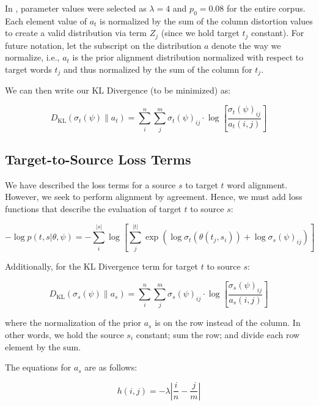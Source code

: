 \documentclass[twoside,twocolumn]{article}
\newlength\mystoreparindent
\newenvironment{myparindent}[1]{%
  \setlength{\mystoreparindent}{\the\parindent}
  \setlength{\parindent}{#1}
  }{%
  \setlength{\parindent}{\mystoreparindent}
}
\begin{document}
\begin{myparindent}{0pt}
In \cite{dyer2013simple}, parameter values were selected as $\lambda = 4$ and
$p_0 = 0.08$ for the entire corpus. Each element value of $a_t$ is normalized
by the sum of the column distortion values to create a valid distribution via
term $Z_j$ (since we hold target $t_j$ constant). For future notation, let the
subscript on the distribution $a$ denote the way we normalize, i.e., $a_t$ is
the prior alignment distribution normalized with respect to target words $t_j$
and thus normalized by the sum of the column for $t_j$.

We can then write our KL Divergence (to be minimized) as:

\begin{equation}
  D_{\mathrm{KL}}(\sigma_t(\psi) \| a_t) =
    \sum_i^n \sum_j^m \sigma_t(\psi)_{ij} \cdot
      \log \left[ \frac{\sigma_t(\psi)_{ij}}{a_t(i, j)} \right]
\end{equation}


\subsection{Target-to-Source Loss Terms}

We have described the loss terms for a source $s$ to target $t$ word alignment.
However, we seek to perform alignment by agreement. Hence, we must add loss
functions that describe the evaluation of target $t$ to source $s$:

\begin{equation}
  -\log  p(t , s | \theta, \psi) =
  - \sum_i^{|s|}  \log \left[ \sum_j^{|t|}
      \exp \left(
        \log \sigma_t(\theta(t_j, s_i)) + \log \sigma_s(\psi)_{ij}
      \right)
    \right]
\end{equation}

\noindent
Additionally, for the KL Divergence term for target $t$ to source $s$:

\begin{equation}
D_{\mathrm{KL}} (\sigma_s(\psi) \| a_s) = \sum_i^n \sum_j^m \sigma_s(\psi)_{ij}
  \cdot \log \left[ \frac{\sigma_s(\psi)_{ij}}{a_s(i, j)} \right]
\end{equation}

\noindent
where the normalization of the prior $a_s$ is on the row instead of the column.
In other words, we hold the source $s_i$ constant; sum the row; and divide each
row element by the sum.

The equations for $a_s$ are as follows:

\begin{equation}
  h(i, j) = {-\lambda \left| \frac{i}{n} - \frac{j}{m}\right|}
\end{equation}


\end{myparindent}
\end{document}
